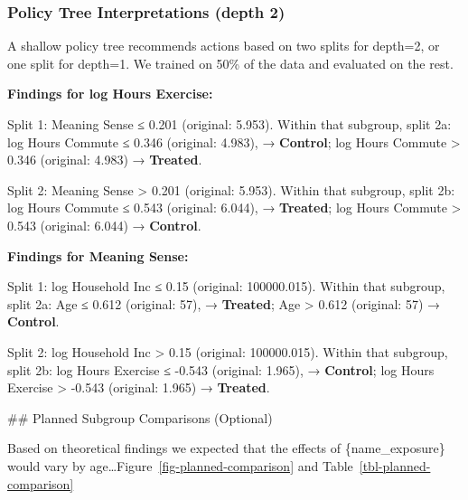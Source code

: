 \documentclass[
  single column]{article}
\begin{document}
\subsubsection{Policy Tree Interpretations (depth
2)}\label{policy-tree-interpretations-depth-2}

A shallow policy tree recommends actions based on two splits for
depth=2, or one split for depth=1. We trained on 50\% of the data and
evaluated on the rest.

\textbf{Findings for log Hours Exercise:}

Split 1: Meaning Sense ≤ 0.201 (original: 5.953). Within that subgroup,
split 2a: log Hours Commute ≤ 0.346 (original: 4.983), →
\textbf{Control}; log Hours Commute \textgreater{} 0.346 (original:
4.983) → \textbf{Treated}.

Split 2: Meaning Sense \textgreater{} 0.201 (original: 5.953). Within
that subgroup, split 2b: log Hours Commute ≤ 0.543 (original: 6.044), →
\textbf{Treated}; log Hours Commute \textgreater{} 0.543 (original:
6.044) → \textbf{Control}.

\textbf{Findings for Meaning Sense:}

Split 1: log Household Inc ≤ 0.15 (original: 100000.015). Within that
subgroup, split 2a: Age ≤ 0.612 (original: 57), → \textbf{Treated}; Age
\textgreater{} 0.612 (original: 57) → \textbf{Control}.

Split 2: log Household Inc \textgreater{} 0.15 (original: 100000.015).
Within that subgroup, split 2b: log Hours Exercise ≤ -0.543 (original:
1.965), → \textbf{Control}; log Hours Exercise \textgreater{} -0.543
(original: 1.965) → \textbf{Treated}.

\newpage{} \#\# Planned Subgroup Comparisons (Optional)

Based on theoretical findings we expected that the effects of
\{name\_exposure\} would vary by
age\ldots{}Figure~\ref{fig-planned-comparison} and
Table~\ref{tbl-planned-comparison}
\end{document}

